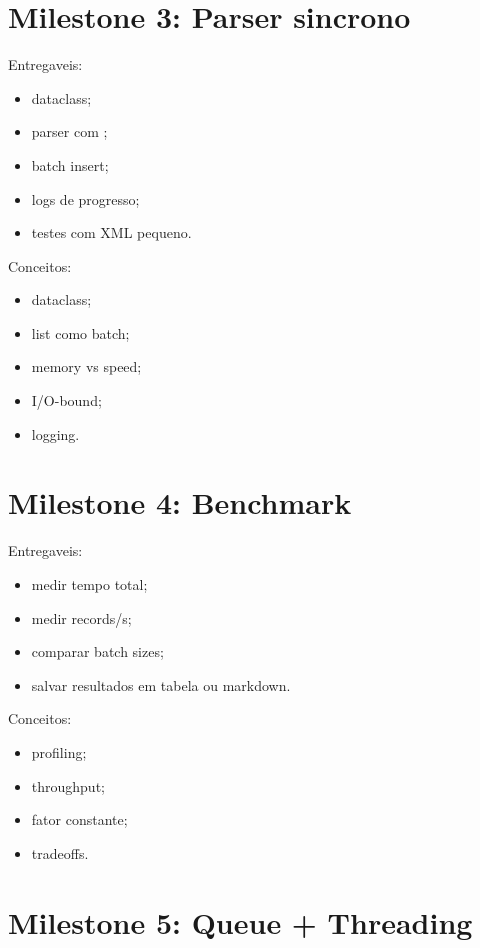 \section{Milestone 3: Parser sincrono}

Entregaveis:

\begin{itemize}
  \item {} dataclass;
  \item parser com ;
  \item batch insert;
  \item logs de progresso;
  \item testes com XML pequeno.
\end{itemize}

Conceitos:

\begin{itemize}
  \item dataclass;
  \item list como batch;
  \item memory vs speed;
  \item I/O-bound;
  \item logging.
\end{itemize}

\section{Milestone 4: Benchmark}

Entregaveis:

\begin{itemize}
  \item medir tempo total;
  \item medir records/s;
  \item comparar batch sizes;
  \item salvar resultados em tabela ou markdown.
\end{itemize}

Conceitos:

\begin{itemize}
  \item profiling;
  \item throughput;
  \item fator constante;
  \item tradeoffs.
\end{itemize}

\section{Milestone 5: Queue + Threading}

